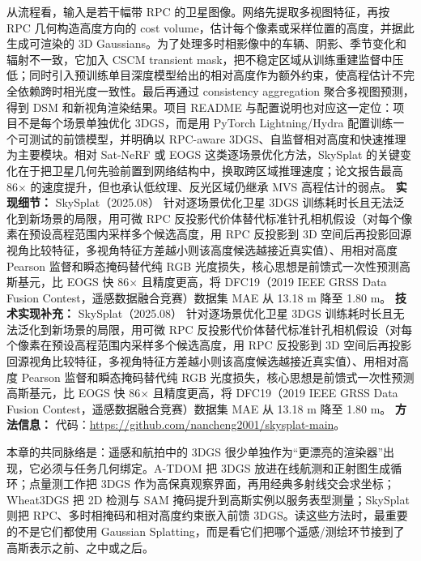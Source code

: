 从流程看，输入是若干幅带 RPC 的卫星图像。网络先提取多视图特征，再按 RPC 几何构造高度方向的 cost volume，估计每个像素或采样位置的高度，并据此生成可渲染的 3D Gaussians。为了处理多时相影像中的车辆、阴影、季节变化和辐射不一致，它加入 CSCM transient mask，把不稳定区域从训练重建监督中压低；同时引入预训练单目深度模型给出的相对高度作为额外约束，使高程估计不完全依赖跨时相光度一致性。最后再通过 consistency aggregation 聚合多视图预测，得到 DSM 和新视角渲染结果。项目 README 与配置说明也对应这一定位：项目不是每个场景单独优化 3DGS，而是用 PyTorch Lightning/Hydra 配置训练一个可测试的前馈模型，并明确以 RPC-aware 3DGS、自监督相对高度和快速推理为主要模块。相对 Sat-NeRF 或 EOGS 这类逐场景优化方法，SkySplat 的关键变化在于把卫星几何先验前置到网络结构中，换取跨区域推理速度；论文报告最高 86$\times$ 的速度提升，但也承认低纹理、反光区域仍继承 MVS 高程估计的弱点。
\textbf{实现细节：} SkySplat（2025.08） 针对逐场景优化卫星 3DGS 训练耗时长且无法泛化到新场景的局限，用可微 RPC 反投影代价体替代标准针孔相机假设（对每个像素在预设高程范围内采样多个候选高度，用 RPC 反投影到 3D 空间后再投影回源视角比较特征，多视角特征方差越小则该高度候选越接近真实值）、用相对高度 Pearson 监督和瞬态掩码替代纯 RGB 光度损失，核心思想是前馈式一次性预测高斯基元，比 EOGS 快 86$\times$ 且精度更高，将 DFC19（2019 IEEE GRSS Data Fusion Contest，遥感数据融合竞赛）数据集 MAE 从 13.18 m 降至 1.80 m。
\textbf{技术实现补充：} SkySplat（2025.08） 针对逐场景优化卫星 3DGS 训练耗时长且无法泛化到新场景的局限，用可微 RPC 反投影代价体替代标准针孔相机假设（对每个像素在预设高程范围内采样多个候选高度，用 RPC 反投影到 3D 空间后再投影回源视角比较特征，多视角特征方差越小则该高度候选越接近真实值）、用相对高度 Pearson 监督和瞬态掩码替代纯 RGB 光度损失，核心思想是前馈式一次性预测高斯基元，比 EOGS 快 86$\times$ 且精度更高，将 DFC19（2019 IEEE GRSS Data Fusion Contest，遥感数据融合竞赛）数据集 MAE 从 13.18 m 降至 1.80 m。
\textbf{方法信息：} 代码：\url{https://github.com/nancheng2001/skysplat-main}。
\begin{takeaway}
本章的共同脉络是：遥感和航拍中的 3DGS 很少单独作为“更漂亮的渲染器”出现，它必须与任务几何绑定。A-TDOM 把 3DGS 放进在线航测和正射图生成循环；点量测工作把 3DGS 作为高保真观察界面，再用经典多射线交会求坐标；Wheat3DGS 把 2D 检测与 SAM 掩码提升到高斯实例以服务表型测量；SkySplat 则把 RPC、多时相掩码和相对高度约束嵌入前馈 3DGS。读这些方法时，最重要的不是它们都使用 Gaussian Splatting，而是看它们把哪个遥感/测绘环节接到了高斯表示之前、之中或之后。
\end{takeaway}
